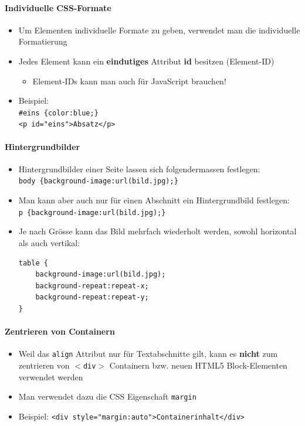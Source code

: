 \documentclass[10pt,a4paper]{article}
\begin{document}
\paragraph{Individuelle CSS-Formate}
\begin{itemize}[noitemsep,topsep=0pt,leftmargin=*]
    \item Um Elementen individuelle Formate zu geben, verwendet man die individuelle Formatierung
    \item Jedes Element kann ein \textbf{eindutiges} Attribut \textbf{id} besitzen (Element-ID)
    \begin{itemize}[noitemsep,topsep=0pt,leftmargin=*]
        \item Element-IDs kann man auch für JavaScript brauchen!
    \end{itemize}
    \item Beispiel:\\
    \verb|#eins {color:blue;}|\\
    \verb|<p id="eins">Absatz</p>|
\end{itemize}

\paragraph{Hintergrundbilder}
\begin{itemize}[noitemsep,topsep=0pt,leftmargin=*]
    \item Hintergrundbilder einer Seite lassen sich folgendermassen festlegen:\\
    \verb|body {background-image:url(bild.jpg);}|
    \item Man kann aber auch nur für einen Abschnitt ein Hintergrundbild festlegen:\\
    \verb|p {background-image:url(bild.jpg);}|
    \item Je nach Grösse kann das Bild mehrfach wiederholt werden, sowohl horizontal als auch vertikal:
    \begin{lstlisting}
table {
    background-image:url(bild.jpg);
    background-repeat:repeat-x;
    background-repeat:repeat-y;
}
    \end{lstlisting}
\end{itemize}

\paragraph{Zentrieren von Containern}
\begin{itemize}[noitemsep,topsep=0pt,leftmargin=*]
    \item Weil das \texttt{align} Attribut nur für Textabschnitte gilt, kann es \textbf{nicht} zum zentrieren von \texttt{$<$div$>$} Containern bzw. neuen HTML5 Block-Elementen verwendet werden
    \item Man verwendet dazu die CSS Eigenschaft \texttt{margin}
    \item Beispiel:
    \verb|<div style="margin:auto">Containerinhalt</div>|
\end{itemize}
\end{document}
